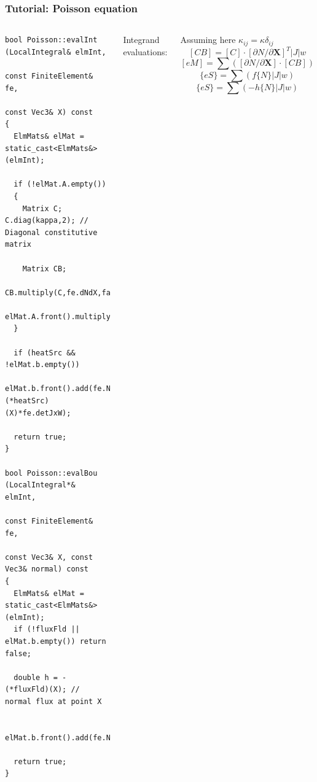 \documentclass{beamer}
\begin{document}
\begin{frame}[fragile] %
 \frametitle{Tutorial: Poisson equation}

 \begin{columns}[c]
  \tiny\begin{verbatim}
bool Poisson::evalInt (LocalIntegral& elmInt,
                       const FiniteElement& fe,
                       const Vec3& X) const
{
  ElmMats& elMat = static_cast<ElmMats&>(elmInt);

  if (!elMat.A.empty())
  {
    Matrix C; C.diag(kappa,2); // Diagonal constitutive matrix

    Matrix CB;
    CB.multiply(C,fe.dNdX,false,true).multiply(fe.detJxW);
    elMat.A.front().multiply(fe.dNdX,CB,false,false,true);
  }

  if (heatSrc && !elMat.b.empty())
    elMat.b.front().add(fe.N,(*heatSrc)(X)*fe.detJxW);

  return true;
}

bool Poisson::evalBou (LocalIntegral*& elmInt,
                       const FiniteElement& fe,
                       const Vec3& X, const Vec3& normal) const
{
  ElmMats& elMat = static_cast<ElmMats&>(elmInt);
  if (!fluxFld || elMat.b.empty()) return false;

  double h = -(*fluxFld)(X); // normal flux at point X

  elMat.b.front().add(fe.N,h*fe.detJxW);

  return true;
}
  \end{verbatim}
  \small
  Integrand evaluations:

  Assuming here $\kappa_{ij} = \kappa\delta_{ij}$
  $$
  [CB] = [C]\cdot[\partial N/\partial\bm{X}]^T|J|w
  $$
  $$
  [eM] = \sum\left([\partial N/\partial\bm{X}]\cdot[CB]\right)
  $$
  $$
  \{eS\} = \sum\left(f\{N\}|J|w\right)
  $$
  \vskip15mm
  $$
  \{eS\} = \sum\left(-h\{N\}|J|w \right)
  $$
 \end{columns}
\end{frame}
\end{document}
